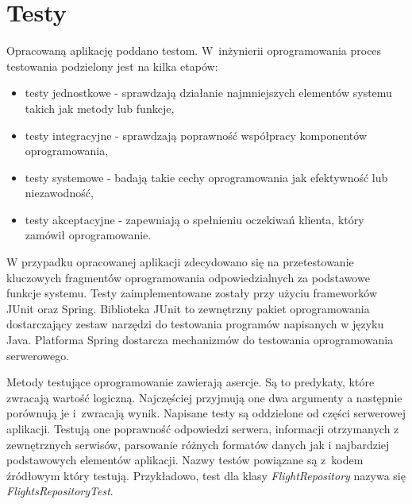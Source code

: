 \documentclass[12pt, twoside]{report}
\begin{document}
\chapter{Testy}
Opracowaną aplikację poddano testom. W~inżynierii oprogramowania proces testowania podzielony jest na kilka etapów\cite{testing}:
\begin{itemize}[noitemsep,topsep=0pt]
\item testy jednostkowe - sprawdzają działanie najmniejszych elementów systemu takich jak metody lub funkcje,
\item testy integracyjne - sprawdzają poprawność współpracy komponentów oprogramowania,
\item testy systemowe - badają takie cechy oprogramowania jak efektywność lub niezawodność,
\item testy akceptacyjne - zapewniają o spełnieniu oczekiwań klienta, który zamówił oprogramowanie.
\end{itemize}

W przypadku opracowanej aplikacji zdecydowano się na przetestowanie kluczowych fragmentów oprogramowania odpowiedzialnych za podstawowe funkcje systemu. Testy zaimplementowane zostały przy użyciu frameworków JUnit oraz Spring. Biblioteka JUnit to zewnętrzny pakiet oprogramowania dostarczający zestaw narzędzi do testowania programów napisanych w języku Java.  Platforma Spring dostarcza mechanizmów do testowania oprogramowania serwerowego.

Metody testujące oprogramowanie zawierają asercje. Są to predykaty, które zwracają wartość logiczną. Najczęściej przyjmują one dwa argumenty a następnie porównują je i~zwracają wynik\cite{assertion}. Napisane testy są oddzielone od części serwerowej aplikacji. Testują one poprawność odpowiedzi serwera, informacji otrzymanych z zewnętrznych serwisów, parsowanie różnych formatów danych jak i najbardziej podstawowych elementów aplikacji. Nazwy testów powiązane są z~kodem źródłowym który testują. Przykładowo, test dla klasy \textit{FlightRepository} nazywa się \textit{FlightsRepositoryTest}.
\end{document}
